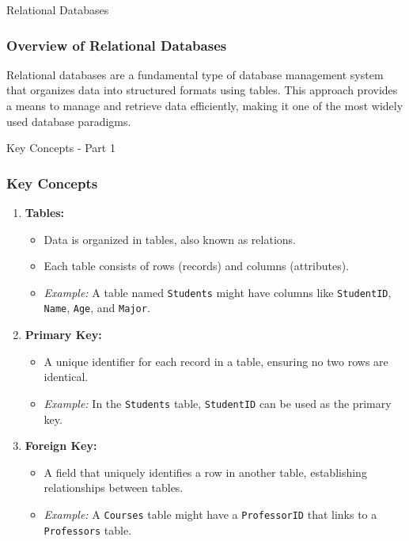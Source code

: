 \documentclass[aspectratio=169]{beamer}
\begin{document}
\begin{frame}[fragile]{Relational Databases}
  \frametitle{Overview of Relational Databases}
  Relational databases are a fundamental type of database management system that organizes data into structured formats using tables. This approach provides a means to manage and retrieve data efficiently, making it one of the most widely used database paradigms.
\end{frame}

\begin{frame}[fragile]{Key Concepts - Part 1}
  \frametitle{Key Concepts}
  \begin{enumerate}
    \item \textbf{Tables:}
      \begin{itemize}
        \item Data is organized in tables, also known as relations.
        \item Each table consists of rows (records) and columns (attributes).
        \item \textit{Example:} A table named \texttt{Students} might have columns like \texttt{StudentID}, \texttt{Name}, \texttt{Age}, and \texttt{Major}.
      \end{itemize}

    \item \textbf{Primary Key:}
      \begin{itemize}
        \item A unique identifier for each record in a table, ensuring no two rows are identical.
        \item \textit{Example:} In the \texttt{Students} table, \texttt{StudentID} can be used as the primary key.
      \end{itemize}

    \item \textbf{Foreign Key:}
      \begin{itemize}
        \item A field that uniquely identifies a row in another table, establishing relationships between tables.
        \item \textit{Example:} A \texttt{Courses} table might have a \texttt{ProfessorID} that links to a \texttt{Professors} table.
      \end{itemize}
  \end{enumerate}
\end{frame}
\end{document}
